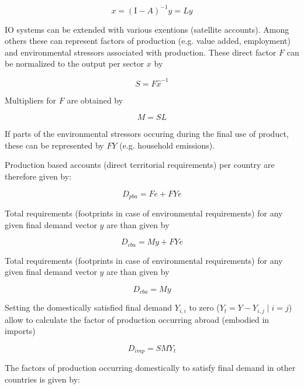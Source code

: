 \documentclass{jors}
\begin{document}
{\begin{equation}
    x = (\mathrm{I}- A)^{-1}y = Ly
\end{equation}


IO systems can be extended with various exentions (satellite accounts).
Among others these can represent factors of production (e.g. value added, employment)
and environmental stressors associated with production.
These direct factor $F$ can be normalized to the output per sector $x$ by

\begin{equation}
    S = F\hat{x}^{-1}
\end{equation}

Multipliers for $F$ are obtained by

\begin{equation}
    M = SL
\end{equation}

If parts of the environmental stressors occuring during the final use of product,
these can be represented by $FY$ (e.g. household emissions).

Production based accounts (direct territorial requirements) per country are therefore given by:

\begin{equation}
    D_{pba} = Fe + FYe
\end{equation}

Total requirements (footprints in case of environmental requirements) for any
given final demand vector $y$ are than given by

\begin{equation}
    D_{cba} = My + FYe
\end{equation}


Total requirements (footprints in case of environmental requirements) for any
given final demand vector $y$ are than given by 

\begin{equation}
    D_{cba} = My
\end{equation}

Setting the domestically satisfied final demand $Y_{i,i}$ to zero ($Y_{t} = Y -
Y_{i,j}\; |\; i = j$) allow to calculate the factor of production occurring
abroad (embodied in imports)

\begin{equation}
    D_{imp} = SMY_{t}
\end{equation}

The factors of production occurring domestically to satisfy final demand in
other countries is given by:

}
\end{document}
